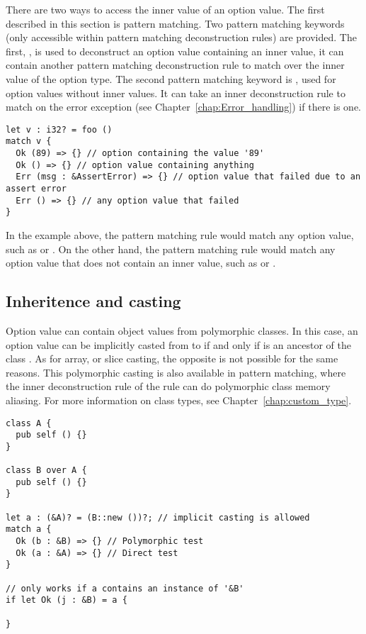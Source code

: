 There are two ways to access the inner value of an option value. The first
described in this section is pattern matching. Two pattern matching keywords
(only accessible within pattern matching deconstruction rules) are provided. The
first, , is used to deconstruct an option value containing an inner
value, it can contain another pattern matching deconstruction rule to match over
the inner value of the option type. The second pattern matching keyword is
, used for option values without inner values. It can take an inner
deconstruction rule to match on the error exception (see
Chapter~\ref{chap:Error_handling}) if there is one.

\begin{lstlisting}[style=coloredverbatim]
let v : i32? = foo ()
match v {
  Ok (89) => {} // option containing the value '89'
  Ok () => {} // option value containing anything
  Err (msg : &AssertError) => {} // option value that failed due to an assert error
  Err () => {} // any option value that failed
}
\end{lstlisting}

In the example above, the  pattern matching rule would match any
option value, such as  or . On the other hand, the
 pattern matching rule would match any option value that does not
contain an inner value, such as  or .


\subsection{Inheritence and casting}

Option value can contain object values from polymorphic classes. In this case,
an option value can be implicitly casted from  to  if and
only if  is an ancestor of the class . As for array, or
slice casting, the opposite is not possible for the same reasons. This
polymorphic casting is also available in pattern matching, where the inner
deconstruction rule of the  rule can do polymorphic class memory
aliasing. For more information on class types, see
Chapter~\ref{chap:custom_type}.

\begin{lstlisting}[style=coloredverbatim]
class A {
  pub self () {}
}

class B over A {
  pub self () {}
}

let a : (&A)? = (B::new ())?; // implicit casting is allowed
match a {
  Ok (b : &B) => {} // Polymorphic test
  Ok (a : &A) => {} // Direct test
}

// only works if a contains an instance of '&B'
if let Ok (j : &B) = a {

}
\end{lstlisting}
